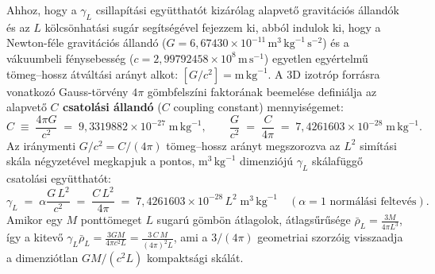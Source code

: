 \documentclass[10pt,a4paper]{article}
\begin{document}
\par
Ahhoz, hogy a $\gamma_L$ csillap\'it\'asi egy\"utthat\'ot kiz\'ar\'olag alapvet\H{o} gravit\'aci\'os \'alland\'ok \'es az $L$ k\"olcs\"onhat\'asi sug\'ar seg\'its\'eg\'evel fejezzem ki, abb\'ol indulok ki, hogy a Newton-f\'ele gravit\'aci\'os \'alland\'o ($G = 6{,}67430\times 10^{-11}\,\text{m}^3\,\text{kg}^{-1}\,\text{s}^{-2}$) \'es a v\'akuumbeli f\'enysebess\'eg ($c = 2{,}99792458\times 10^{8}\,\text{m}\,\text{s}^{-1}$) egyetlen egy\'ertelm\H{u} t\"omeg--hossz \'atvált\'asi ar\'anyt alkot: $[G/c^2] = \text{m}\,\text{kg}^{-1}$. A 3D izotr\'op forr\'asra vonatkoz\'o Gauss-t\"orv\'eny $4\pi$ g\"ombfelsz\'ini faktor\'anak beemel\'ese defini\'alja az alapvet\H{o} \textbf{$C$ csatol\'asi \'alland\'o} ($C$ coupling constant) mennyis\'egemet:
\begin{equation}
  C \;\equiv\; \frac{4\pi G}{c^2} \;=\; 9{,}3319882\times 10^{-27}\;\text{m}\,\text{kg}^{-1}, \qquad
  \frac{G}{c^2} \;=\; \frac{C}{4\pi} \;=\; 7{,}4261603\times 10^{-28}\;\text{m}\,\text{kg}^{-1}.
\end{equation}
Az ir\'anymenti $G/c^2 = C/(4\pi)$ t\"omeg--hossz ar\'anyt megszorozva az $L^2$ sim\'it\'asi sk\'ala n\'egyzet\'evel megkapjuk a pontos, $\text{m}^3\,\text{kg}^{-1}$ dimenzi\'oj\'u $\gamma_L$ sk\'alaf\"ugg\H{o} csatol\'asi egy\"utthat\'ot:
\begin{equation}
  \gamma_L \;=\; \alpha\frac{G\,L^2}{c^2} \;=\; \frac{C\,L^2}{4\pi} \;=\; 7{,}4261603\times 10^{-28}\,L^2\;\text{m}^3\,\text{kg}^{-1}\quad(\alpha=1\text{ norm\'al\'asi feltev\'es}).
\end{equation}
Amikor egy $M$ pontt\"omeget $L$ sugar\'u g\"omb\"on \'atlagolok, \'atlags\H{u}r\H{u}s\'ege $\bar{\rho}_L = \frac{3M}{4\pi L^3}$, \'igy a kitev\H{o} $\gamma_L \bar{\rho}_L = \frac{3GM}{4\pi c^2 L} = \frac{3\,C\,M}{(4\pi)^2 L}$, ami a $3/(4\pi)$ geometriai szorz\'oig visszaadja a dimenzi\'otlan $GM/(c^2 L)$ kompakts\'agi sk\'al\'at.
\end{document}
